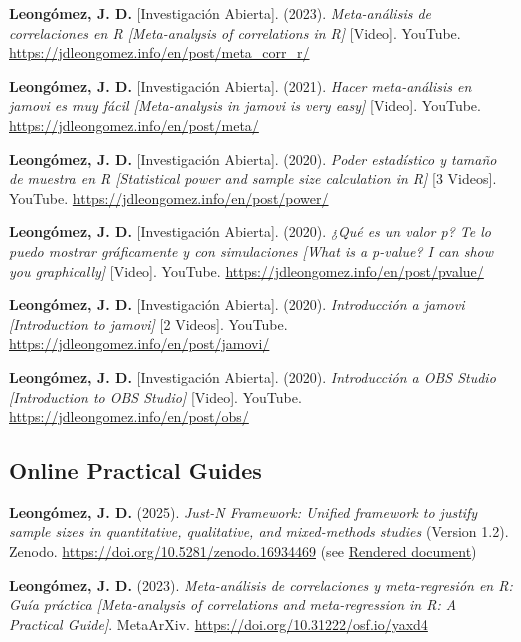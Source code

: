 \documentclass[11pt,a4paper,]{awesome-cv}
\begin{document}
\begingroup
  \footnotesize
  \setlength{\parindent}{-0.5in}
  \setlength{\leftskip}{0.5in}

\textbf{Leongómez, J. D.} {[}Investigación Abierta{]}. (2023).
\emph{Meta-análisis de correlaciones en R {[}Meta-analysis of
correlations in R{]}} {[}Video{]}. YouTube.
\url{https://jdleongomez.info/en/post/meta_corr_r/}

\textbf{Leongómez, J. D.} {[}Investigación Abierta{]}. (2021).
\emph{Hacer meta-análisis en jamovi es muy fácil {[}Meta-analysis in
jamovi is very easy{]}} {[}Video{]}. YouTube.
\url{https://jdleongomez.info/en/post/meta/}

\textbf{Leongómez, J. D.} {[}Investigación Abierta{]}. (2020).
\emph{Poder estadístico y tamaño de muestra en R {[}Statistical power
and sample size calculation in R{]}} {[}3 Videos{]}. YouTube.
\url{https://jdleongomez.info/en/post/power/}

\textbf{Leongómez, J. D.} {[}Investigación Abierta{]}. (2020).
\emph{¿Qué es un valor p? Te lo puedo mostrar gráficamente y con
simulaciones {[}What is a p-value? I can show you graphically{]}}
{[}Video{]}. YouTube. \url{https://jdleongomez.info/en/post/pvalue/}

\textbf{Leongómez, J. D.} {[}Investigación Abierta{]}. (2020).
\emph{Introducción a jamovi {[}Introduction to jamovi{]}} {[}2
Videos{]}. YouTube. \url{https://jdleongomez.info/en/post/jamovi/}

\textbf{Leongómez, J. D.} {[}Investigación Abierta{]}. (2020).
\emph{Introducción a OBS Studio {[}Introduction to OBS Studio{]}}
{[}Video{]}. YouTube. \url{https://jdleongomez.info/en/post/obs/}

\endgroup

\subsection{\texorpdfstring{\textbf{Online Practical Guides}}{}}\label{section-4}

\begingroup
  \footnotesize
  \setlength{\parindent}{-0.5in}
  \setlength{\leftskip}{0.5in}

\textcolor{teal}{\faStar} \textbf{Leongómez, J. D.} (2025). \emph{Just-N
Framework: Unified framework to justify sample sizes in quantitative,
qualitative, and mixed-methods studies} (Version 1.2). Zenodo.
\url{https://doi.org/10.5281/zenodo.16934469} (see
\href{https://jdleongomez.github.io/just_n/en/}{Rendered document})

\textcolor{teal}{\faStar} \textbf{Leongómez, J. D.} (2023).
\emph{Meta-análisis de correlaciones y meta-regresión en R: Guía
práctica {[}Meta-analysis of correlations and meta-regression in R: A
Practical Guide{]}}. MetaArXiv.
\url{https://doi.org/10.31222/osf.io/yaxd4}
\end{document}
